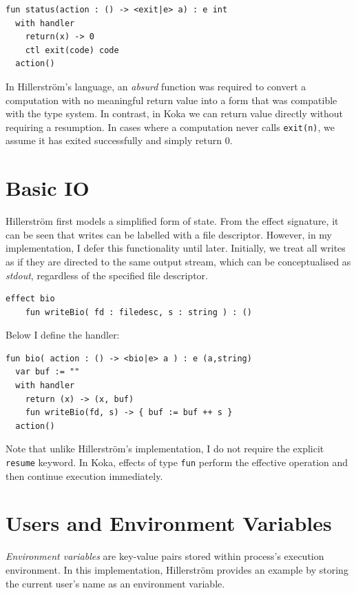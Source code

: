 \documentclass[logo,bsc,singlespacing,parskip]{infthesis}
\begin{document}
\begin{lstlisting}
fun status(action : () -> <exit|e> a) : e int
  with handler 
    return(x) -> 0
    ctl exit(code) code
  action()
\end{lstlisting}
In Hillerström’s language, an \textit{absurd} function was required to convert a computation with no meaningful return value into a form that was compatible with the type system. In contrast, in Koka we can return value directly without requiring a resumption. In cases where a computation never calls \lstinline{exit(n)}, we assume it has exited successfully and simply return 0.

\section{Basic IO}
Hillerström first models a simplified form of state. From the effect signature, it can be seen that writes can be labelled with a file descriptor. However, in my implementation, I defer this functionality until later. Initially, we treat all writes as if they are directed to the same output stream, which can be conceptualised as \textit{stdout}, regardless of the specified file descriptor.

\begin{lstlisting}
effect bio
    fun writeBio( fd : filedesc, s : string ) : ()
\end{lstlisting}
\vspace{1em}
Below I define the handler:

\begin{lstlisting}
fun bio( action : () -> <bio|e> a ) : e (a,string)
  var buf := ""    
  with handler
    return (x) -> (x, buf)
    fun writeBio(fd, s) -> { buf := buf ++ s }
  action()
\end{lstlisting}

Note that unlike Hillerström’s implementation, I do not require the explicit \lstinline{resume} keyword. In Koka, effects of type \lstinline{fun} perform the effective operation and then continue execution immediately.

\section{Users and Environment Variables}
\textit{Environment variables} are key-value pairs stored within process's execution environment. In this implementation, Hillerström provides an example by storing the current user's name as an environment variable.
\end{document}
